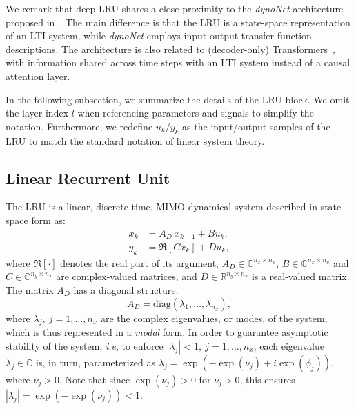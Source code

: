 \documentclass{article} %
\newcommand{\R}{\mathbb{R}}
\newcommand{\C}{\mathbb{C}}
\newcommand{\diag}{\text{diag}}
\newcommand{\range}[2]{{#1},\ldots, {#2}}
\newcommand{\nx}{{n_x}}
\newcommand{\ny}{{n_y}}
\newcommand{\nin}{{n_u}}
\begin{document}
We  remark that deep LRU shares a close proximity to the \emph{dynoNet} architecture
proposed in~\cite{forgione21}. The main difference is that the LRU is a state-space representation of an LTI system, while \emph{dynoNet} employs input-output transfer function descriptions. 
The architecture is also related to (decoder-only) Transformers~\cite{Radford2019}, with information shared across time steps with an LTI system instead of a causal attention layer.

In the following subsection, we summarize the details of the LRU block. We omit the layer index $l$ when referencing parameters and signals to simplify the notation. Furthermore, %
we redefine $u_k/y_k$ as the input/output samples of the LRU to match the standard notation of linear system theory.

\subsection*{Linear Recurrent Unit}
The LRU is a linear, discrete-time, MIMO dynamical system described in state-space form as:
\begin{subequations}\label{eq:lru_ss}
\begin{align}
    x_k &= A_D \ x_{k-1} + B u_k, \\
    y_k &= \Re[{C x_k}] + D u_k,
\end{align}
\end{subequations}
where $\Re[\cdot]$ denotes the real part of its argument, $A_D \in \C^{\nx \times \nx}$, $B \in \C^{\nx \times \nin}$ and $C \in \C^{\ny \times \nx}$ are  complex-valued matrices, and $D \in \R^{\ny \times \nin}$ is a real-valued matrix. 
The matrix $A_D$ has a diagonal structure:
\begin{equation}\label{eq:diagA}
A_D = \diag(\lambda_1, \ldots, \lambda_{\nx}),
\end{equation}
where $\lambda_j, \ j=\range{1}{\nx}$ are the complex eigenvalues, or {modes}, of the system, which is thus represented in a \emph{modal} form.
In order to guarantee  
asymptotic stability of the system, \emph{i.e}, to enforce  
$|\lambda_j| <1, \  j = \range{1}{\nx}$, each  eigenvalue $\lambda_j \in \mathbb{C}$ is, in turn, parameterized as
$
    \lambda_j = \exp(-\exp(\nu_j)+i \exp(\phi_j)),
$
where $\nu_j > 0$. Note that since $\exp(\nu_j)>0$ for $\nu_j > 0$, this ensures  $|\lambda_j|= \exp(-\exp(\nu_j))<1$. 
\end{document}
